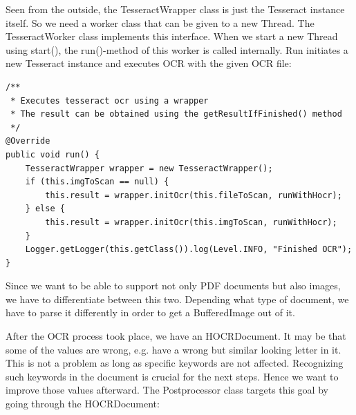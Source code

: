 Seen from the outside, the TesseractWrapper class is just the Tesseract instance itself. So we need a worker class that can be given to a new Thread. The TesseractWorker class implements this interface. When we start a new Thread using start(), the run()-method of this worker is called internally. Run initiates a new Tesseract instance and executes OCR with the given OCR file: 

\begin{lstlisting}[caption={Initiation of the OCR wrapper}]
/**
 * Executes tesseract ocr using a wrapper
 * The result can be obtained using the getResultIfFinished() method
 */
@Override
public void run() {
    TesseractWrapper wrapper = new TesseractWrapper();
    if (this.imgToScan == null) {
        this.result = wrapper.initOcr(this.fileToScan, runWithHocr);
    } else {
        this.result = wrapper.initOcr(this.imgToScan, runWithHocr);
    }
    Logger.getLogger(this.getClass()).log(Level.INFO, "Finished OCR");
}
\end{lstlisting}

Since we want to be able to support not only PDF documents but also images, we have to differentiate between this two. Depending what type of document, we have to parse it differently in order to get a BufferedImage out of it.

After the OCR process took place, we have an HOCRDocument. It may be that some of the values are wrong, e.g. have a wrong but similar looking letter in it. This is not a problem as long as specific keywords are not affected. Recognizing such keywords in the document is crucial for the next steps. Hence we want to improve those values afterward. 
The Postprocessor class targets this goal by going through the HOCRDocument:

